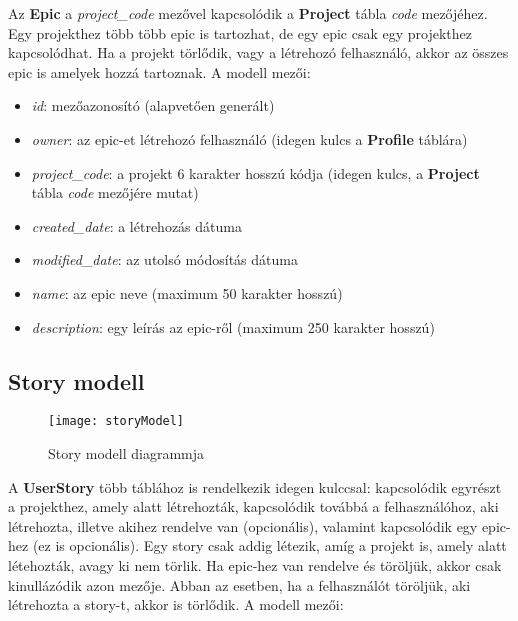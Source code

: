 Az \textbf{Epic} a \textit{project\_code} mezővel kapcsolódik a \textbf{Project} tábla \textit{code} mezőjéhez. Egy projekthez több több epic is tartozhat, de egy epic csak egy projekthez kapcsolódhat. Ha a projekt törlődik, vagy a létrehozó felhasználó, akkor az összes epic is amelyek hozzá tartoznak. A modell mezői:

\begin{itemize}
	\item \textit{id}: mezőazonosító (alapvetően generált)
	\item \textit{owner}: az epic-et létrehozó felhasználó (idegen kulcs a \textbf{Profile} táblára)
	\item \textit{project\_code}: a projekt 6 karakter hosszú kódja (idegen kulcs, a \textbf{Project} tábla \textit{code} mezőjére mutat)
	\item \textit{created\_date}: a létrehozás dátuma
	\item \textit{modified\_date}: az utolsó módosítás dátuma
	\item \textit{name}: az epic neve (maximum 50 karakter hosszú)
	\item \textit{description}: egy leírás az epic-ről (maximum 250 karakter hosszú)
\end{itemize}

\subsection{Story modell}

\begin{figure}[H]
	\centering
	\texttt{[image: storyModel]}
	\caption{Story modell diagrammja}
	\label{fig:storymodel}
\end{figure}

A \textbf{UserStory} több táblához is rendelkezik idegen kulccsal: kapcsolódik egyrészt a projekthez, amely alatt létrehozták, kapcsolódik továbbá a felhasználóhoz, aki létrehozta, illetve akihez rendelve van (opcionális), valamint kapcsolódik egy epic-hez (ez is opcionális). Egy story csak addig létezik, amíg a projekt is, amely alatt létehozták, avagy ki nem törlik. Ha epic-hez van rendelve és töröljük, akkor csak kinullázódik azon mezője. Abban az esetben, ha a felhasználót töröljük, aki létrehozta a story-t, akkor is törlődik. A modell mezői:

